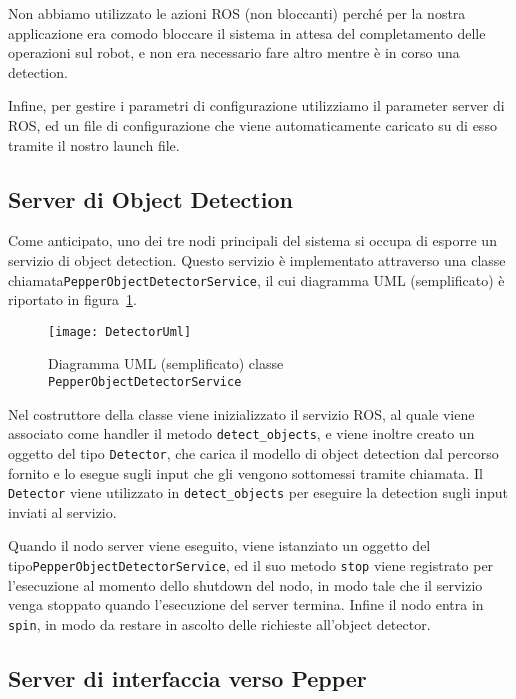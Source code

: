 Non abbiamo utilizzato le azioni ROS (non bloccanti) perché per la nostra applicazione era comodo bloccare il sistema in attesa del completamento delle operazioni sul robot, e non era necessario fare altro mentre è in corso una detection.

Infine, per gestire i parametri di configurazione utilizziamo il parameter server di ROS, ed un file di configurazione che viene automaticamente caricato su di esso tramite il nostro launch file. 

\subsection{Server di Object Detection}

Come anticipato, uno dei tre nodi principali del sistema si occupa di esporre un servizio di object detection. 
Questo servizio è implementato attraverso una classe chiamata\linebreak\verb|PepperObjectDetectorService|, il cui diagramma UML (semplificato) è riportato in figura~\ref{fig:detector_uml}.

\begin{figure}[ht]
	\centering
	\texttt{[image: DetectorUml]}
	\caption{Diagramma UML (semplificato) classe \texttt{PepperObjectDetectorService}}
	\label{fig:detector_uml}
\end{figure}

Nel costruttore della classe viene inizializzato il servizio ROS, al quale viene associato come handler il metodo \verb|detect_objects|, e viene inoltre creato un oggetto del tipo \verb|Detector|, che carica il modello di object detection dal percorso fornito e lo esegue sugli input che gli vengono sottomessi tramite chiamata. Il \verb|Detector| viene utilizzato in \verb|detect_objects| per eseguire la detection sugli input inviati al servizio.

Quando il nodo server viene eseguito, viene istanziato un oggetto del tipo\linebreak\verb|PepperObjectDetectorService|, ed il suo metodo \verb|stop| viene registrato per l'esecuzione al momento dello shutdown del nodo, in modo tale che il servizio venga stoppato quando l'esecuzione del server termina.
Infine il nodo entra in \verb|spin|, in modo da restare in ascolto delle richieste all'object detector.

\subsection{Server di interfaccia verso Pepper}

